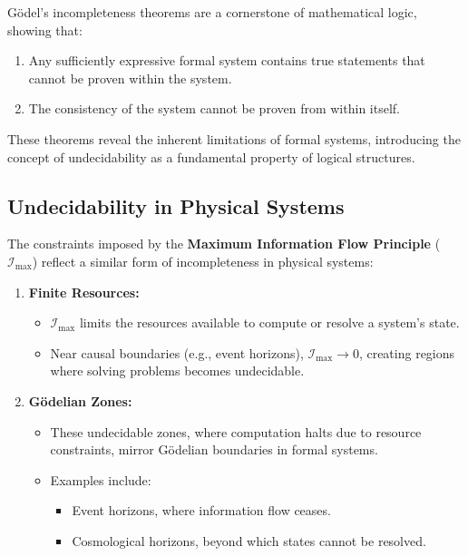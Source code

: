 \documentclass[12pt]{article}
\begin{document}
Gödel’s incompleteness theorems are a cornerstone of mathematical logic, showing that:
\begin{enumerate}
    \item Any sufficiently expressive formal system contains true statements that cannot be proven within the system.
    \item The consistency of the system cannot be proven from within itself.
\end{enumerate}

These theorems reveal the inherent limitations of formal systems, introducing the concept of undecidability as a fundamental property of logical structures.

\subsection{Undecidability in Physical Systems}

The constraints imposed by the \textbf{Maximum Information Flow Principle} ($\mathcal{I}_{\text{max}}$) reflect a similar form of incompleteness in physical systems:
\begin{enumerate}
    \item \textbf{Finite Resources:}
    \begin{itemize}
        \item $\mathcal{I}_{\text{max}}$ limits the resources available to compute or resolve a system’s state.
        \item Near causal boundaries (e.g., event horizons), $\mathcal{I}_{\text{max}} \to 0$, creating regions where solving problems becomes undecidable.
    \end{itemize}

    \item \textbf{Gödelian Zones:}
    \begin{itemize}
        \item These undecidable zones, where computation halts due to resource constraints, mirror Gödelian boundaries in formal systems.
        \item Examples include:
        \begin{itemize}
            \item Event horizons, where information flow ceases.
            \item Cosmological horizons, beyond which states cannot be resolved.
        \end{itemize}
    \end{itemize}
\end{enumerate}
\end{document}
